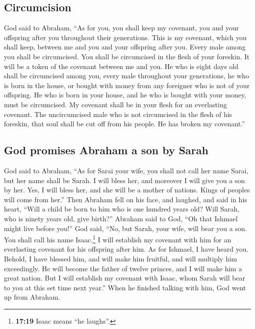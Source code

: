 \hypertarget{circumcision}{%
\subsection{Circumcision}\label{circumcision}}

 God said to Abraham, ``As for you, you shall keep my
covenant, you and your offspring after you throughout their generations.
 This is my covenant, which you shall keep, between me
and you and your offspring after you. Every male among you shall be
circumcised.  You shall be circumcised in the flesh of
your foreskin. It will be a token of the covenant between me and you.
 He who is eight days old shall be circumcised among you,
every male throughout your generations, he who is born in the house, or
bought with money from any foreigner who is not of your offspring.
 He who is born in your house, and he who is bought with
your money, must be circumcised. My covenant shall be in your flesh for
an everlasting covenant.  The uncircumcised male who is
not circumcised in the flesh of his foreskin, that soul shall be cut off
from his people. He has broken my covenant.''

\hypertarget{god-promises-abraham-a-son-by-sarah}{%
\subsection{God promises Abraham a son by
Sarah}\label{god-promises-abraham-a-son-by-sarah}}

 God said to Abraham, ``As for Sarai your wife, you shall
not call her name Sarai, but her name shall be Sarah.  I
will bless her, and moreover I will give you a son by her. Yes, I will
bless her, and she will be a mother of nations. Kings of peoples will
come from her.''  Then Abraham fell on his face, and
laughed, and said in his heart, ``Will a child be born to him who is one
hundred years old? Will Sarah, who is ninety years old, give birth?''
 Abraham said to God, ``Oh that Ishmael might live before
you!''  God said, ``No, but Sarah, your wife, will bear
you a son. You shall call his name Isaac.\footnote{\textbf{17:19} Isaac
  means ``he laughs''.} I will establish my covenant with him for an
everlasting covenant for his offspring after him.  As for
Ishmael, I have heard you. Behold, I have blessed him, and will make him
fruitful, and will multiply him exceedingly. He will become the father
of twelve princes, and I will make him a great nation. 
But I will establish my covenant with Isaac, whom Sarah will bear to you
at this set time next year.''  When he finished talking
with him, God went up from Abraham.

